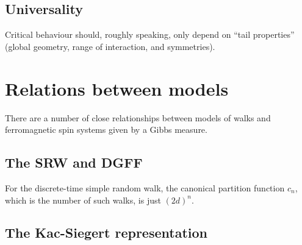 

\subsection{Universality}

Critical behaviour should, roughly speaking, only depend on ``tail properties''
(global geometry, range of interaction, and symmetries).


\section{Relations between models}

There are a number of close relationships between models of walks and ferromagnetic spin
systems given by a Gibbs measure.


\subsection{The SRW and DGFF}


For the discrete-time simple random walk, the canonical partition function $c_n$,
which is the number of such walks, is just $(2 d)^n$.


\subsection{The Kac-Siegert representation}




\pagebreak

